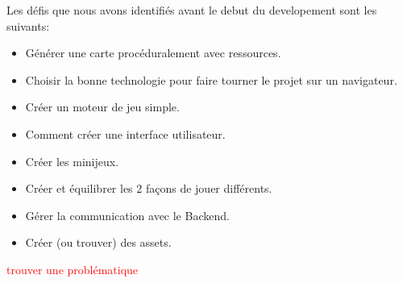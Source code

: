         Les défis que nous avons identifiés avant le debut du developement sont les suivants:
        \begin{itemize}
            \item Générer une carte procéduralement avec ressources.
            \item Choisir la bonne technologie pour faire tourner le projet sur un navigateur.
            \item Créer un moteur de jeu simple.
            \item Comment créer une interface utilisateur.
            \item Créer les minijeux.
            \item Créer et équilibrer les 2 façons de jouer différents.
            \item Gérer la communication avec le Backend.
            \item Créer (ou trouver) des assets.
        \end{itemize}


        \textcolor{red}{trouver une problématique}